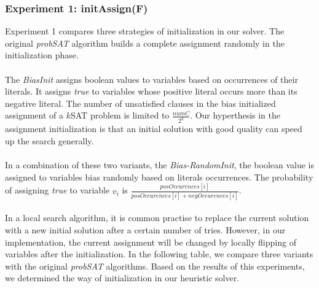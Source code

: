 \documentclass[12pt,a4paper,twoside]{scrartcl}
\numberwithin{equation}{section}
\begin{document}
\subsubsection{Experiment 1: initAssign(F)}
\label{sec:Experiment 1}
Experiment 1 compares three strategies of initialization in our solver. The original \emph{probSAT} algorithm builds a complete assignment randomly in the initialization phase. \\ \\The \emph{BiasInit} assigns boolean values to variables based on occurrences of their literals. It assigns \emph{true} to variables whose positive literal occurs more than its negative literal. The number of unsatisfied clauses in the bias initialized assignment of a $k$SAT problem is limited to $\frac{numC}{2^k}$. Our hyperthesis in the assignment initialization is that an initial solution with good quality can speed up the search generally. \\ \\ In a combination of these two variants, the \emph{Bias-RandomInit}, the boolean value is assigned to variables bias randomly  based on literals occurrences. The probability of assigning \emph{true} to variable $v_i$ is $\frac{posOccurences[i]}{posOccurences[i]+negOccurences[i]}$.\\\\ In a local search algorithm, it is common practise to replace the current solution with a new initial solution after a certain number of tries. However, in our implementation, the current assignment will be changed by locally flipping of variables after the initialization. In the following table, we compare three variants with the original \emph{probSAT} algorithms. Based on the results of this experiments, we determined the way of initialization in our heuristic solver. 
\\
\end{document}
